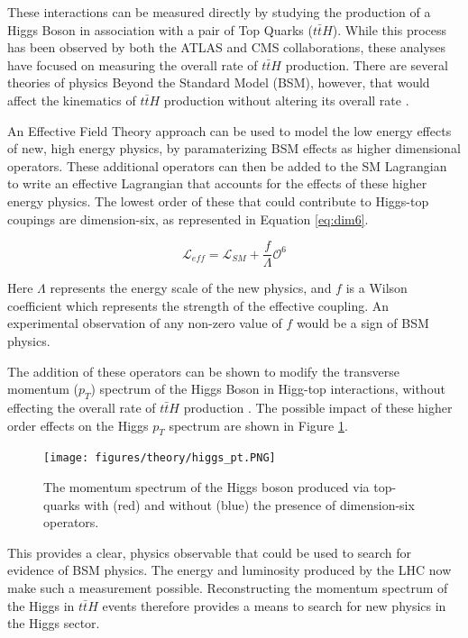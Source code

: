 These interactions can be measured directly by studying the production of a Higgs Boson in association with a pair of Top Quarks ($t\bar{t}H$). While this process has been observed by both the ATLAS \cite{ttH_paper} and CMS \cite{Sirunyan_2018} collaborations, these analyses have focused on measuring the overall rate of $t\bar{t}H$ production. There are several theories of physics Beyond the Standard Model (BSM), however, that would affect the kinematics of $t\bar{t}H$ production without altering its overall rate \cite{Dumont_2013}.

An Effective Field Theory approach can be used to model the low energy effects of new, high energy physics, by paramaterizing BSM effects as higher dimensional operators. These additional operators can then be added to the SM Lagrangian to write an effective Lagrangian that accounts for the effects of these higher energy physics. The lowest order of these that could contribute to Higgs-top coupings are dimension-six, as represented in Equation \ref{eq:dim6}.

\begin{equation}
\label{eq:dim6}
\mathcal{L}_{eff} = \mathcal{L}_{SM} + \frac{f}{\Lambda}\mathcal{O}^6
\end{equation}

Here $\Lambda$ represents the energy scale of the new physics, and $f$ is a Wilson coefficient which represents the strength of the effective coupling. An experimental observation of any non-zero value of $f$ would be a sign of BSM physics.

The addition of these operators can be shown to modify the transverse momentum ($p_T$) spectrum of the Higgs Boson in Higg-top interactions, without effecting the overall rate of $t\bar{t}H$ production \cite{Banerjee_2014}. The possible impact of these higher order effects on the Higgs $p_T$ spectrum are shown in Figure \ref{fig:eft_pt}. 

\begin{figure}[H]
\centering
   \texttt{[image: figures/theory/higgs\_pt.PNG]}
\caption{The momentum spectrum of the Higgs boson produced via top-quarks with (red) and without (blue) the presence of dimension-six operators.}
\label{fig:eft_pt}
\end{figure}

This provides a clear, physics observable that could be used to search for evidence of BSM physics. The energy and luminosity produced by the LHC now make such a measurement possible. Reconstructing the momentum spectrum of the Higgs in $t\bar{t}H$ events therefore provides a means to search for new physics in the Higgs sector.

